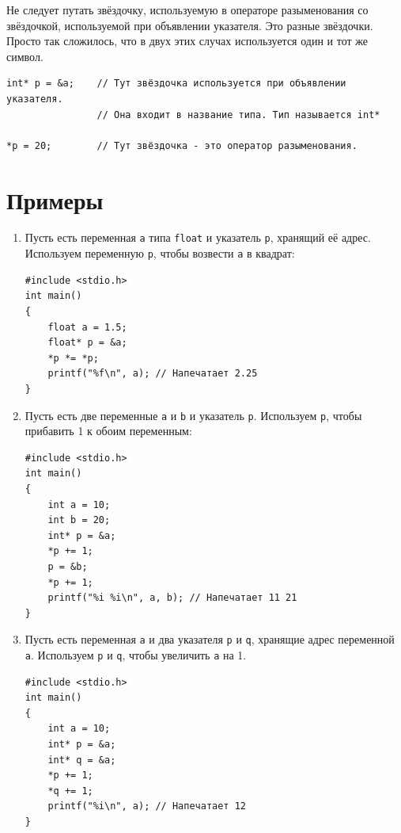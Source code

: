 \documentclass[10pt]{article}
\begin{document}
Не следует путать звёздочку, используемую в операторе разыменования со звёздочкой, используемой при объявлении указателя. 
Это разные звёздочки. Просто так сложилось, что в двух этих случах используется один и тот же символ.
\begin{lstlisting}
int* p = &a;    // Тут звёздочка используется при объявлении указателя. 
                // Она входит в название типа. Тип называется int*

*p = 20;        // Тут звёздочка - это оператор разыменования.
\end{lstlisting}

\newpage
\section*{Примеры}
\begin{enumerate}

\item Пусть есть переменная \texttt{a} типа \texttt{float} и указатель \texttt{p}, хранящий её адрес. Используем переменную \texttt{p}, чтобы возвести \texttt{a} в квадрат:
\begin{lstlisting}
#include <stdio.h>
int main() 
{
    float a = 1.5;
    float* p = &a;
    *p *= *p;
    printf("%f\n", a); // Напечатает 2.25
}
\end{lstlisting}

\item Пусть есть две переменные \texttt{a} и \texttt{b} и указатель \texttt{p}. Используем \texttt{p}, чтобы прибавить 1 к обоим переменным:
\begin{lstlisting}
#include <stdio.h>
int main() 
{
    int a = 10;
    int b = 20;
    int* p = &a;
    *p += 1;
    p = &b;
    *p += 1;
    printf("%i %i\n", a, b); // Напечатает 11 21
}
\end{lstlisting}

\item Пусть есть переменная \texttt{a} и два указателя \texttt{p} и \texttt{q}, хранящие адрес переменной \texttt{a}. Используем \texttt{p} и \texttt{q}, чтобы увеличить \texttt{a} на 1. 
\begin{lstlisting}
#include <stdio.h>
int main() 
{
    int a = 10;
    int* p = &a;
    int* q = &a;
    *p += 1;
    *q += 1;
    printf("%i\n", a); // Напечатает 12
}
\end{lstlisting}



\end{enumerate}
\end{document}
